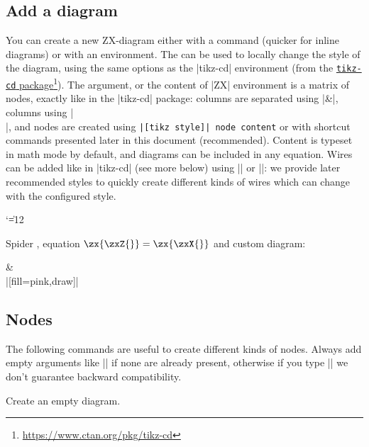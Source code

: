 \documentclass[a4paper]{ltxdoc}
\newcommand{\mylink}[2]{\href{#1}{#2}\footnote{\url{#1}}}
\begin{document}
{\subsection{Add a diagram}
\begin{pgfmanualentry}
  \extractcommand\zx{}\@@
  \@@
  \pgfmanualbody
  You can create a new ZX-diagram either with a command (quicker for inline diagrams) or with an environment. The  can be used to locally change the style of the diagram, using the same options as the |{tikz-cd}| environment (from the \mylink{https://www.ctan.org/pkg/tikz-cd}{\texttt{tikz-cd} package}). The  argument, or the content of |{ZX}| environment is a \tikzname{} matrix of nodes, exactly like in the |tikz-cd| package: columns are separated using |&|, columns using |\\|, and nodes are created using \verb#|[tikz style]| node content# or with shortcut commands presented later in this document (recommended). Content is typeset in math mode by default, and diagrams can be included in any equation. Wires can be added like in |tikz-cd| (see more below) using |\arrow| or |\ar|: we provide later recommended styles to quickly create different kinds of wires which can change with the configured style.
{\catcode`\|=12 %
\begin{codeexample}[]
Spider \zx{\zxZ{\alpha}}, equation $\zx{\zxZ{}} = \zx{\zxX{}}$ %
and custom diagram: %
\begin{ZX}[red]
  \zxZ{\beta} \arrow[r]                           & \zxZ{\alpha} \\
  |[fill=pink,draw]| \gamma {}
\end{ZX}
\end{codeexample}
}
\end{pgfmanualentry}

\subsection{Nodes}

The following commands are useful to create different kinds of nodes. Always add empty arguments like |\example{}| if none are already present, otherwise if you type |\example| we don't guarantee backward compatibility.

\begin{command}{\zxEmptyDiagram{}}
  Create an empty diagram.
\begin{codeexample}[width=3cm]
\begin{ZX}
  \zxEmptyDiagram{}
\end{ZX}
\end{codeexample}
\end{command}


}
\end{document}
